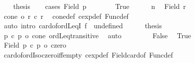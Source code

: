 \begin{isabellebody}
\isanewline
\ \ \isamarkupfalse%
\ {\isacharquery}{\kern0pt}thesis\isanewline
\ \ \isamarkupfalse%
\ {\isacharparenleft}{\kern0pt}cases\ {\isachardoublequoteopen}Field\ p{}\ {\isacharequal}{\kern0pt}\ {\isacharbraceleft}{\kern0pt}{\isacharbraceright}{\kern0pt}{\isachardoublequoteclose}{\isacharparenright}{\kern0pt}\isanewline
\ \ \ \ \isamarkupfalse%
\ True\isanewline
\ \ \ \ \isamarkupfalse%
\ n\ \isamarkupfalse%
\ {\isachardoublequoteopen}Field\ r{}\ {\isacharequal}{\kern0pt}\ {\isacharbraceleft}{\kern0pt}{\isacharbraceright}{\kern0pt}{\isachardoublequoteclose}\ \isacommand{{\isachardot}{\kern0pt}}\isamarkupfalse%
\isanewline
\ \ \ \ \isamarkupfalse%
\ {\isachardoublequoteopen}cone\ {\isasymle}o\ r{}\ {\isacharcircum}{\kern0pt}c\ r{}{\isachardoublequoteclose}\ \isamarkupfalse%
\ cone{\isacharunderscore}{\kern0pt}def\ cexp{\isacharunderscore}{\kern0pt}def\ Func{\isacharunderscore}{\kern0pt}def\isanewline
\ \ \ \ \ \ \isamarkupfalse%
\ {\isacharparenleft}{\kern0pt}auto\ intro{\isacharcolon}{\kern0pt}\ card{\isacharunderscore}{\kern0pt}of{\isacharunderscore}{\kern0pt}ordLeqI{\isacharbrackleft}{\kern0pt}\ f{\isacharequal}{\kern0pt}{\isachardoublequoteopen}{\isasymlambda}{\isacharunderscore}{\kern0pt}\ {\isacharunderscore}{\kern0pt}{\isachardot}{\kern0pt}\ undefined{\isachardoublequoteclose}{\isacharbrackright}{\kern0pt}{\isacharparenright}{\kern0pt}\isanewline
\ \ \ \ \isamarkupfalse%
\ {\isacharquery}{\kern0pt}thesis\ \isamarkupfalse%
\ {\isacartoucheopen}p{}\ {\isacharcircum}{\kern0pt}c\ p{}\ {\isasymle}o\ cone{\isacartoucheclose}\ ordLeq{\isacharunderscore}{\kern0pt}transitive\ \isamarkupfalse%
\ auto\isanewline
\ \ \isamarkupfalse%
\isanewline
\ \ \ \ \isamarkupfalse%
\ False\ \isamarkupfalse%
\ True\ \isamarkupfalse%
\ {\isachardoublequoteopen}{\isacharbar}{\kern0pt}Field\ {\isacharparenleft}{\kern0pt}p{}\ {\isacharcircum}{\kern0pt}c\ p{}{\isacharparenright}{\kern0pt}{\isacharbar}{\kern0pt}\ {\isacharequal}{\kern0pt}o\ czero{\isachardoublequoteclose}\isanewline
\ \ \ \ \ \ \isamarkupfalse%
\ card{\isacharunderscore}{\kern0pt}of{\isacharunderscore}{\kern0pt}ordIso{\isacharunderscore}{\kern0pt}czero{\isacharunderscore}{\kern0pt}iff{\isacharunderscore}{\kern0pt}empty\ cexp{\isacharunderscore}{\kern0pt}def\ Field{\isacharunderscore}{\kern0pt}card{\isacharunderscore}{\kern0pt}of\ Func{\isacharunderscore}{\kern0pt}def\ \isamarkupfalse%

\end{isabellebody}

